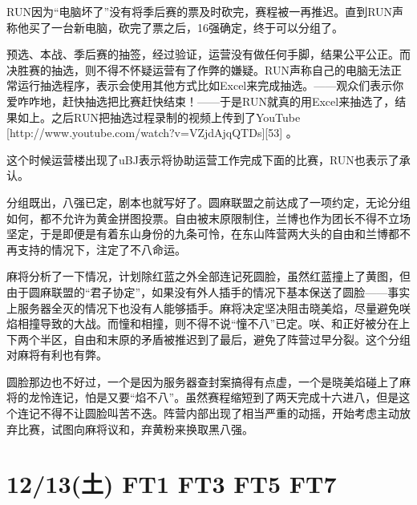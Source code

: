 RUN因为“电脑坏了”没有将季后赛的票及时砍完，赛程被一再推迟。直到RUN声称他买了一台新电脑，砍完了票之后，16强确定，终于可以分组了。

预选、本战、季后赛的抽签，经过验证，运营没有做任何手脚，结果公平公正。而决胜赛的抽选，则不得不怀疑运营有了作弊的嫌疑。RUN声称自己的电脑无法正常运行抽选程序，表示会使用其他方式比如Excel来完成抽选。——观众们表示你爱咋咋地，赶快抽选把比赛赶快结束！——于是RUN就真的用Excel来抽选了，结果如上。之后RUN把抽选过程录制的视频上传到了YouTube [http://www.youtube.com/watch?v=VZjdAjqQTDs][53] 。

这个时候运营楼出现了uBJ表示将协助运营工作完成下面的比赛，RUN也表示了承认。

分组既出，八强已定，剧本也就写好了。圆麻联盟之前达成了一项约定，无论分组如何，都不允许为黄金拼图投票。自由被末原限制住，兰博也作为团长不得不立场坚定，于是即便是有着东山身份的九条可怜，在东山阵营两大头的自由和兰博都不再支持的情况下，注定了不八命运。

麻将分析了一下情况，计划除红蓝之外全部连记死圆脸，虽然红蓝撞上了黄图，但由于圆麻联盟的“君子协定”，如果没有外人插手的情况下基本保送了圆脸——事实上服务器全灭的情况下也没有人能够插手。麻将决定坚决阻击晓美焰，尽量避免咲焰相撞导致的大战。而憧和相撞，则不得不说“憧不八”已定。咲、和正好被分在上下两个半区，自由和末原的矛盾被推迟到了最后，避免了阵营过早分裂。这个分组对麻将有利也有弊。

圆脸那边也不好过，一个是因为服务器查封案搞得有点虚，一个是晓美焰碰上了麻将的龙怜连记，怕是又要“焰不八”。虽然赛程缩短到了两天完成十六进八，但是这个连记不得不让圆脸叫苦不迭。阵营内部出现了相当严重的动摇，开始考虑主动放弃比赛，试图向麻将议和，弃黄粉来换取黑八强。

\section{12/13(土) FT1 FT3 FT5 FT7}

